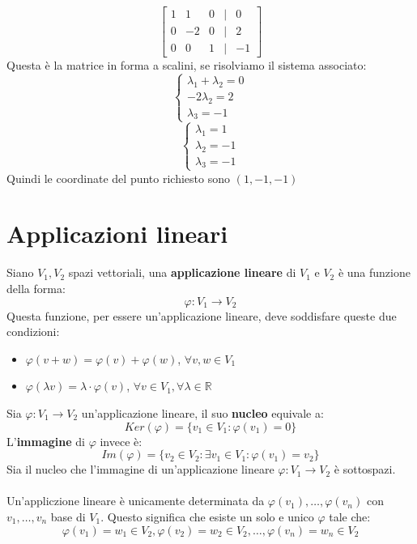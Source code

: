 \documentclass[12pt,a4paper]{article}
\let\oldsection\section
\renewcommand{\section}{\clearpage\oldsection}
\begin{document}
\[
\begin{bmatrix}
  1 & 1 & 0 & | & 0\\
  0 & -2 & 0 & | & 2\\
  0 & 0 & 1 & | & -1
\end{bmatrix}
\]
Questa è la matrice in forma a scalini, se risolviamo il sistema associato:
\[
\begin{cases}
  \lambda_1 + \lambda_2 = 0\\
  -2\lambda_2 = 2\\
  \lambda_3 = -1
\end{cases}
\]
\[
\begin{cases}
  \lambda_1 = 1\\
  \lambda_2 = -1\\
  \lambda_3 = -1
\end{cases}
\]
Quindi le coordinate del punto richiesto sono $(1,-1,-1)$

\section{Applicazioni lineari}
Siano $V_1,V_2$ spazi vettoriali, una \textbf{applicazione lineare} di $V_1$ e $V_2$ è una funzione della forma:
\[
\varphi : V_1 \rightarrow V_2
\]
Questa funzione, per essere un'applicazione lineare, deve soddisfare queste due condizioni:
\begin{itemize}
  \item $\varphi(v+w) = \varphi(v) + \varphi(w)$, $\forall v,w \in V_1$
  \item $\varphi(\lambda v) = \lambda \cdot \varphi(v)$, $\forall v \in V_1, \forall \lambda \in \mathbb{R}$
\end{itemize}
Sia $\varphi : V_1 \rightarrow V_2$ un'applicazione lineare, il suo \textbf{nucleo} equivale a:
\[
Ker(\varphi) = \{v_1 \in V_1 : \varphi(v_1) = 0\}
\]
L'\textbf{immagine} di $\varphi$ invece è:
\[
Im(\varphi) = \{v_2 \in V_2 : \exists v_1 \in V_1 : \varphi(v_1) = v_2\}
\]
Sia il nucleo che l'immagine di un'applicazione lineare $\varphi:V_1 \to V_2$ è sottospazi.\\\\
Un'appliczione lineare è unicamente determinata da $\varphi(v_1), \ldots, \varphi(v_n)$ con $v_1,\ldots,v_n$ base di $V_1$.
Questo significa che esiste un solo e unico $\varphi$ tale che:
\[
\varphi(v_1) = w_1 \in V_2, \varphi(v_2) = w_2 \in V_2, \ldots, \varphi(v_n) = w_n \in V_2 
\] 
\end{document}
